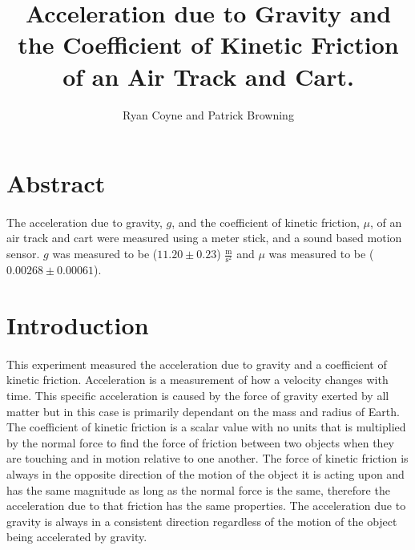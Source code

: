 \documentclass[12pt]{article}
\begin{document}
    \title{Acceleration due to Gravity and the Coefficient of Kinetic Friction of an Air Track and Cart.}
    \author{Ryan Coyne and Patrick Browning}
    \maketitle
    \section{Abstract}

        \paragraph{} The acceleration due to gravity, $g$, and the coefficient 
        of kinetic friction, $\mu$, of an air track and cart were
         measured using a meter stick, and a sound based motion sensor. 
        $g$ was measured to be (\(11.20 \pm 0.23\)) \(\frac{\text{m}}{\text{s}^2}\) and $\mu$ was measured to be 
        (\(0.00268 \pm 0.00061\)).
    \section{Introduction}
    \paragraph{}This experiment measured the acceleration due to gravity and a coefficient of kinetic friction. Acceleration is a measurement of how a velocity changes with time.
       This specific acceleration is caused by the force of gravity exerted by all matter but in this case is primarily dependant on the mass and radius of Earth. The 
       coefficient of kinetic friction is a scalar value with no units that is multiplied by the normal force to find the force of friction between two objects when they are 
       touching and in motion relative to one another. The force of kinetic friction is always in the opposite direction of the motion of the object it is acting upon and 
       has the same magnitude as long as the normal force is the same, therefore the acceleration due to that friction has the same properties. The acceleration due to gravity 
       is always in a consistent direction regardless of the motion of the object being accelerated by gravity.
\end{document}
